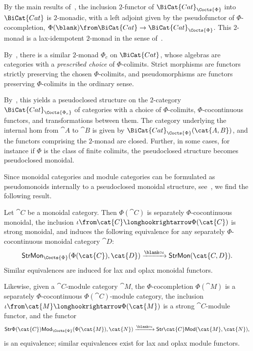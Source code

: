 By the main results of~\cite{zoeberlein76:doctr,kock95:monad},
the inclusion \(2\)\hyp{}functor of \(\BiCat{Cat}_{\Cocts{\Phi}}\) into \(\BiCat{Cat}\) is \(2\)\hyp{}monadic,
with a left adjoint given by the pseudofunctor of \(\Phi\)\hyp{}cocompletion, \(\Phi(\blank)\from \BiCat{Cat} \to \BiCat{Cat}_{\Cocts{\Phi}}\).
This \(2\)\hyp{}monad is a lax-idempotent \(2\)\hyp{}monad in the sense of~\cite{kelly97}.

By~\cite{kelly00}, there is a similar \(2\)\hyp{}monad \(\Phi_{c}\) on \(\BiCat{Cat}\),
whose algebras are categories with a \emph{prescribed choice} of \(\Phi\)\hyp{}colimits.
Strict morphisms are functors strictly preserving the chosen \(\Phi\)\hyp{}colimits,
and pseudomorphisms are functors preserving \(\Phi\)\hyp{}colimits in the ordinary sense.

By~\cite[Theorem~6.2]{lopez11:pseud-kz}, this yields a pseudoclosed structure on the \(2\)\hyp{}category \(\BiCat{Cat}_{\Cocts{\Phi_{c}}}\)
of categories with a choice of \(\Phi\)\hyp{}colimits, \(\Phi\)\hyp{}cocontinuous functors, and transformations between them.
The category underlying the internal hom from \(\cat{A}\) to \(\cat{B}\) is given by \(\BiCat{Cat}_{\Cocts{\Phi}}(\cat{A,B})\),
and the functors comprising the \(2\)\hyp{}monad are closed.
Further, in some cases, for instance if \(\Phi\) is the class of finite colimits,
the pseudoclosed structure becomes pseudoclosed monoidal.

Since monoidal categories and module categories can be formulated
as pseudomonoids internally to a pseudoclosed monoidal structure,
see~\cite{hyland02:pseud},
we find the following result.

\begin{proposition}\label{cocompletingnonsense}
  Let \(\cat{C}\) be a monoidal category.
  Then \(\Phi(\cat{C})\) is separately \(\Phi\)\hyp{}cocontinuous monoidal,
  the inclusion \(\iota\from \cat{C} \longhookrightarrow \Phi(\cat{C})\) is strong monoidal,
  and induces the following equivalence
  for any separately \(\Phi\)\hyp{}cocontinuous monoidal category \(\cat{D}\):
  \[
    \mathsf{StrMon}_{\Cocts{\Phi}}(\Phi(\cat{C}),\cat{D}) \xrightarrow{\blank \circ \iota} \mathsf{StrMon}(\cat{C,D}).
  \]
  Similar equivalences are induced for lax and oplax monoidal functors.

  Likewise, given a \(\cat{C}\)\hyp{}module category \(\cat{M}\),
  the \(\Phi\)\hyp{}cocompletion \(\Phi(\cat{M})\) is a separately \(\Phi\)\hyp{}cocontinuous \(\Phi(\cat{C})\)\hyp{}module category,
  the inclusion \(\iota\from \cat{M} \longhookrightarrow \Phi(\cat{M})\) is a strong \(\cat{C}\)\hyp{}module functor, and the functor
  \begin{equation}\label{cocompletingmodules}
    \mathsf{Str}\Phi(\cat{C})\mathsf{Mod}_{\Cocts{\Phi}}(\Phi(\cat{M}),\cat{N})
    \xrightarrow{\blank \circ \iota}
    \mathsf{Str}\cat{C}\mathsf{Mod}(\cat{M}, \cat{N}),
  \end{equation}
  is an equivalence;
  similar equivalences exist for lax and oplax module functors.
\end{proposition}

